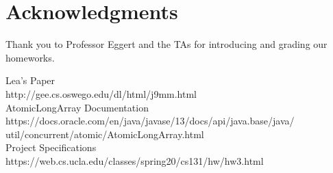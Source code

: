 \section*{Acknowledgments}

Thank you to Professor Eggert and the TAs for introducing and grading our homeworks.




Lea's Paper \\
http://gee.cs.oswego.edu/dl/html/j9mm.html \\
AtomicLongArray Documentation \\ https://docs.oracle.com/en/java/javase/13/docs/api/java.base/java/ \\ util/concurrent/atomic/AtomicLongArray.html \\
Project Specifications \\ https://web.cs.ucla.edu/classes/spring20/cs131/hw/hw3.html


